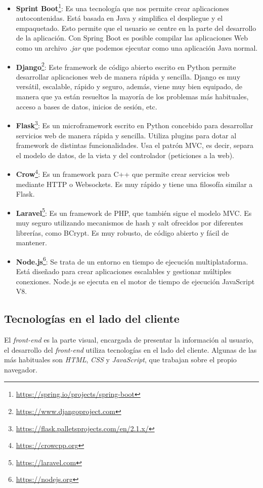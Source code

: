 \documentclass[a4paper, 12pt, oneside]{book}
\begin{document}
\begin{itemize}
\item \textbf{Sprint Boot}\footnote{\url{https://spring.io/projects/spring-boot}}: Es una tecnología que nos permite crear aplicaciones autocontenidas. Está basada en Java y simplifica el despliegue y el empaquetado. Esto permite que el usuario se centre en la parte del desarrollo de la aplicación. Con Spring Boot es posible compilar las aplicaciones Web como un archivo \textit{.jar} que podemos ejecutar como una aplicación Java normal. 

\item \textbf{Django}\footnote{\url{https://www.djangoproject.com}}: Este framework de código abierto escrito en Python permite desarrollar aplicaciones web de manera rápida y sencilla. Django es muy versátil, escalable, rápido y seguro, además, viene muy bien equipado, de manera que ya están resueltos la mayoría de los problemas más habituales, acceso a bases de datos, inicios de sesión, etc. 

\item \textbf{Flask}\footnote{\url{https://flask.palletsprojects.com/en/2.1.x/}}: Es un microframework escrito en Python concebido para desarrollar servicios web de manera rápida y sencilla. Utiliza plugins para dotar al framework de distintas funcionalidades. Usa el patrón MVC, es decir, separa el modelo de datos, de la vista y del controlador (peticiones a la web).  

\item \textbf{Crow}\footnote{\url{https://crowcpp.org}}: Es un framework para C++ que permite crear servicios web mediante HTTP o Websockets. Es muy rápido y tiene una filosofía similar a Flask. 

\item \textbf{Laravel}\footnote{\url{https://laravel.com}}: Es un framework de PHP, que también sigue el modelo MVC. Es muy seguro utilizando mecanismos de hash y salt ofrecidos por diferentes librerías, como BCrypt. Es muy robusto, de código abierto y fácil de mantener.  

\item \textbf{Node.js}\footnote{\url{https://nodejs.org}}: Se trata de un entorno en tiempo de ejecución multiplataforma. Está diseñado para crear aplicaciones escalables y gestionar múltiples conexiones. Node.js se ejecuta en el motor de tiempo de ejecución JavaScript V8.

\end{itemize}

\subsection{Tecnologías en el lado del cliente}
\label{subsec:tecnlogías en el lado del cliente}
El \textit{front-end} es la parte visual, encargada de presentar la información al usuario, el desarrollo del \textit{front-end} utiliza tecnologías en el lado del cliente. Algunas de las más habituales son \textit{HTML}, \textit{CSS} y \textit{JavaScript}, que trabajan sobre el propio navegador.
\end{document}
